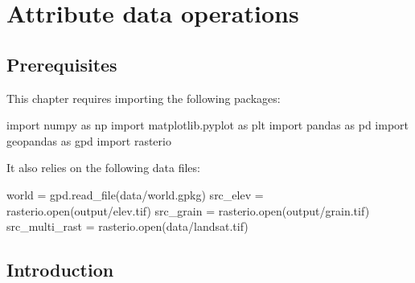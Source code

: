 \documentclass[
  letterpaper,
]{krantz}
\newenvironment{Shaded}{\begin{snugshade}}{\end{snugshade}}
\newcommand{\BuiltInTok}[1]{\textcolor[rgb]{0.00,0.23,0.31}{#1}}
\newcommand{\ImportTok}[1]{\textcolor[rgb]{0.00,0.46,0.62}{#1}}
\newcommand{\NormalTok}[1]{\textcolor[rgb]{0.00,0.23,0.31}{#1}}
\newcommand{\OperatorTok}[1]{\textcolor[rgb]{0.37,0.37,0.37}{#1}}
\newcommand{\StringTok}[1]{\textcolor[rgb]{0.13,0.47,0.30}{#1}}
\begin{document}

\chapter{Attribute data operations}\label{sec-attr}

\section*{Prerequisites}\label{prerequisites-1}


This chapter requires importing the following packages:

\begin{Shaded}
\begin{Highlighting}[]
\ImportTok{import}\NormalTok{ numpy }\ImportTok{as}\NormalTok{ np}
\ImportTok{import}\NormalTok{ matplotlib.pyplot }\ImportTok{as}\NormalTok{ plt}
\ImportTok{import}\NormalTok{ pandas }\ImportTok{as}\NormalTok{ pd}
\ImportTok{import}\NormalTok{ geopandas }\ImportTok{as}\NormalTok{ gpd}
\ImportTok{import}\NormalTok{ rasterio}
\end{Highlighting}
\end{Shaded}

It also relies on the following data files:

\begin{Shaded}
\begin{Highlighting}[]
\NormalTok{world }\OperatorTok{=}\NormalTok{ gpd.read\_file(}\StringTok{\textquotesingle{}data/world.gpkg\textquotesingle{}}\NormalTok{)}
\NormalTok{src\_elev }\OperatorTok{=}\NormalTok{ rasterio.}\BuiltInTok{open}\NormalTok{(}\StringTok{\textquotesingle{}output/elev.tif\textquotesingle{}}\NormalTok{)}
\NormalTok{src\_grain }\OperatorTok{=}\NormalTok{ rasterio.}\BuiltInTok{open}\NormalTok{(}\StringTok{\textquotesingle{}output/grain.tif\textquotesingle{}}\NormalTok{)}
\NormalTok{src\_multi\_rast }\OperatorTok{=}\NormalTok{ rasterio.}\BuiltInTok{open}\NormalTok{(}\StringTok{\textquotesingle{}data/landsat.tif\textquotesingle{}}\NormalTok{)}
\end{Highlighting}
\end{Shaded}

\section{Introduction}\label{introduction-1}
\end{document}
